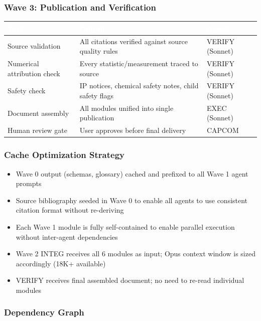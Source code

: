\documentclass[11pt,letterpaper]{article}
\newcommand{\tableheader}[1]{\textbf{\sffamily\textcolor{white}{#1}}}
\begin{document}
\subsubsection{Wave 3: Publication and Verification}

\begin{center}
\begin{tabularx}{\textwidth}{L{4cm}XC{2cm}}
\toprule
{}
\tableheader{Task} & \tableheader{Output} & \tableheader{Agent} \\
\midrule
Source validation & All citations verified against source quality rules & VERIFY (Sonnet) \\
Numerical attribution check & Every statistic/measurement traced to source & VERIFY (Sonnet) \\
Safety check & IP notices, chemical safety notes, child safety flags & VERIFY (Sonnet) \\
Document assembly & All modules unified into single publication & EXEC (Sonnet) \\
Human review gate & User approves before final delivery & CAPCOM \\
\bottomrule
\end{tabularx}
\end{center}

\subsubsection{Cache Optimization Strategy}

\begin{itemize}[noitemsep]
  \item Wave 0 output (schemas, glossary) cached and prefixed to all Wave 1 agent prompts
  \item Source bibliography seeded in Wave 0 to enable all agents to use consistent citation format without re-deriving
  \item Each Wave 1 module is fully self-contained to enable parallel execution without inter-agent dependencies
  \item Wave 2 INTEG receives all 6 modules as input; Opus context window is sized accordingly (18K+ available)
  \item VERIFY receives final assembled document; no need to re-read individual modules
\end{itemize}

\subsubsection{Dependency Graph}
\end{document}
